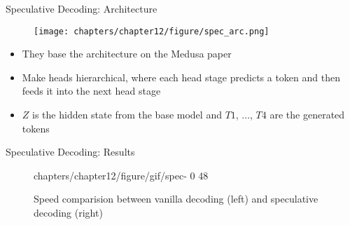 \begin{vbframe}{Speculative Decoding: Architecture}

\vfill

\begin{minipage}[c]{.4\textwidth}
    \vfill
    \begin{figure}
		\centering
		\texttt{[image: chapters/chapter12/figure/spec\_arc.png]}
        \\ 
	\end{figure}
    \vfill
\end{minipage}
\hfill
\begin{minipage}[c]{.49\textwidth}
    \hfill
    \begin{itemize}
        \item They base the architecture on the Medusa paper 
        \item Make heads hierarchical, where each head stage predicts a token and then feeds it into the next head stage
        \item $Z$ is the hidden state from the base model and $T1$, ..., $T4$ are the generated tokens
    \end{itemize}
\end{minipage}

    
\end{vbframe}
    

\begin{vbframe}{Speculative Decoding: Results}

\begin{figure}
    \centering
    {chapters/chapter12/figure/gif/spec-}%
    {0}%
    {48}%
    \caption{Speed comparision between vanilla decoding (left) and speculative decoding (right) }
\end{figure}


    
\end{vbframe}


